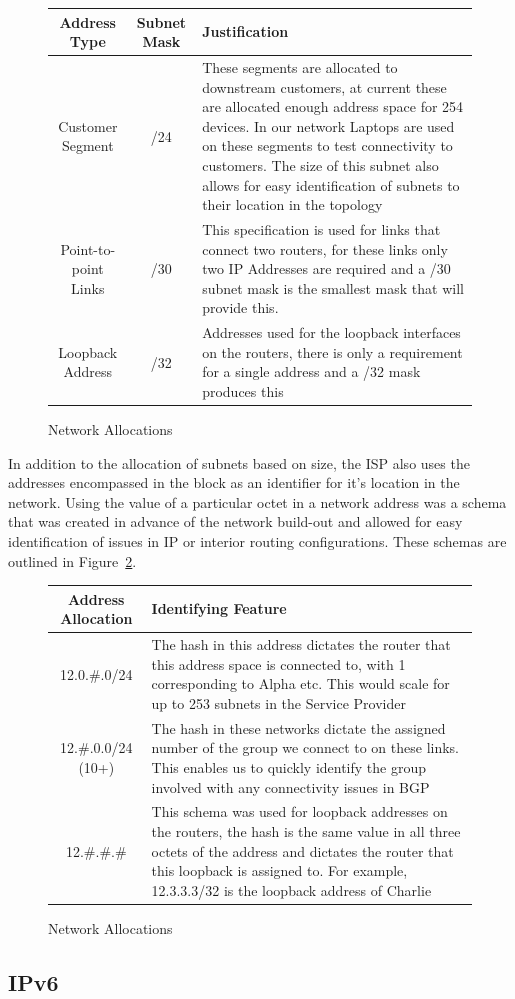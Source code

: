 \begin{figure}[h!]
	\caption{Network Allocations}
	\label{figure:network-alloc-1}
	\centering
	\begin{tabular}{|c|c|p{5.5cm}|}
		\hline \textbf{Address Type} & \textbf{Subnet Mask} & \textbf{Justification} \\
		\hline Customer Segment & /24 & These segments are allocated to downstream customers, at current these are allocated enough address space for 254 devices. In our network Laptops are used on these segments to test connectivity to customers. The size of this subnet also allows for easy identification of subnets to their location in the topology  \\
		\hline Point-to-point Links & /30 & This specification is used for links that connect two routers, for these links only two IP Addresses are required and a /30 subnet mask is the smallest mask that will provide this. \\
		\hline Loopback Address & /32 & Addresses used for the loopback interfaces on the routers, there is only a requirement for a single address and a /32 mask produces this \\
		\hline
	\end{tabular}
\end{figure}


In addition to the allocation of subnets based on size, the ISP also uses the
addresses encompassed in the block as an identifier for it's location in the
network. Using the value of a particular octet in a network address was a schema
that was created in advance of the network build-out and allowed for easy
identification of issues in IP or interior routing configurations. These schemas
are outlined in Figure~\ref{figure:network-alloc-2}.
\FloatBarrier
\begin{figure}[h!]
	\caption{Network Allocations}
	\label{figure:network-alloc-2}
	\centering
	\begin{tabular}{|c|p{8cm}|}
		\hline \textbf{Address Allocation} & \textbf{Identifying Feature} \\
		\hline 12.0.\#.0/24 & The hash in this address dictates the router that this address space is connected to, with 1 corresponding to Alpha etc. This would scale for up to 253 subnets in the Service Provider \\
		\hline 12.\#.0.0/24 (10+) & The hash in these networks dictate the assigned number of the group we connect to on these links. This enables us to quickly identify the group involved with any connectivity issues in BGP  \\
		\hline 12.\#.\#.\# & This schema was used for loopback addresses on the routers, the hash is the same value in all three octets of the address and dictates the router that this loopback is assigned to. For example, 12.3.3.3/32 is the loopback address of Charlie \\
		\hline
	\end{tabular}
\end{figure}
\FloatBarrier

\subsection{IPv6}